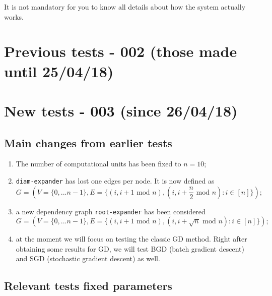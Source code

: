 \documentclass[11pt]{article}
\providecommand{\tightlist}{%
      \setlength{\itemsep}{0pt}\setlength{\parskip}{0pt}}
\begin{document}
It is not mandatory for you to know all details about how the system
actually works.

    \section{Previous tests - 002 (those made until
25/04/18)}\label{previous-tests---002-those-made-until-250418}

    \section{New tests - 003 (since
26/04/18)}\label{new-tests---003-since-260418}

\subsection{Main changes from earlier
tests}\label{main-changes-from-earlier-tests}

\begin{enumerate}
\def\labelenumi{\arabic{enumi}.}
\tightlist
\item
  The number of computational units has been fixed to \(n=10\);
\item
  \texttt{diam-expander} has lost one edges per node. It is now defined
  as
  \[G=(V=\{0,...n-1\},E=\{(i, i+1\text{ mod }n), (i, i+\frac{n}{2}\text{ mod }n) : i \in [n]\});\]
\item
  a new dependency graph \texttt{root-expander} has been considered
  \[G=(V=\{0,...n-1\},E=\{(i, i+1\text{ mod }n), (i, i+\sqrt{n}\text{ mod }n) : i \in [n]\});\]
\item
  at the moment we will focus on testing the classic GD method. Right
  after obtaining some results for GD, we will test BGD (batch gradient
  descent) and SGD (stochastic gradient descent) as well.
\end{enumerate}

    \subsection{Relevant tests fixed
parameters}\label{relevant-tests-fixed-parameters}
\end{document}
